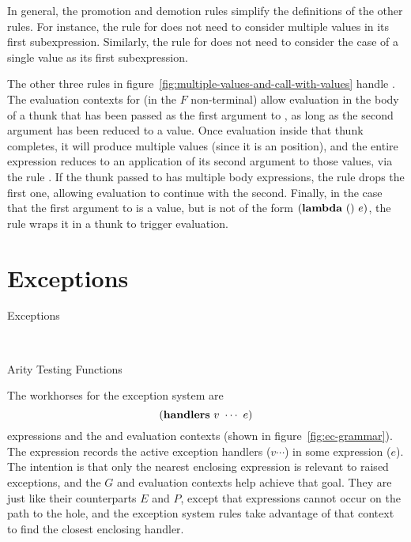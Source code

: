 In general, the promotion and demotion rules simplify the definitions
of the other rules. For instance, the rule for  does not
need to consider multiple values in its first subexpression.
Similarly, the rule for  does not need to consider the
case of a single value as its first subexpression.

The other three rules in
figure~\ref{fig:multiple-values-and-call-with-values} handle
. The evaluation contexts for
 (in the $F$ non-terminal) allow
evaluation in the body of a thunk that has been passed as the first
argument to , as long as the second argument
has been reduced to a value. Once evaluation inside that thunk
completes, it will produce multiple values (since it is an \Fstar{}
position), and the entire  expression reduces
to an application of its second argument to those values, via the rule
. If the thunk passed to  has
multiple body expressions, the rule  drops the first
one, allowing evaluation to continue with the second. Finally, in the
case that the first argument to  is a value,
but is not of the form $(\textnormal{\textbf{lambda}}~()~e)$, the rule
 wraps it in a thunk to trigger evaluation.

\section{Exceptions}

\beginfig
\begin{center}

\end{center}
\caption{Exceptions}\label{fig:exceptions}
\endfig

\beginfig
\begin{center}
\begin{minipage}{0.45\textwidth}

\end{minipage}
~
\begin{minipage}{0.45\textwidth}

\end{minipage}
\end{center}
\caption{Arity Testing Functions}\label{fig:arity}
\endfig

The workhorses for the exception system are $$(\textnormal{\textbf{handlers}}~v~\cdots{}~e)$$ expressions and the  and  evaluation contexts (shown in
figure~\ref{fig:ec-grammar}). The  expression records the
active exception handlers ($v \cdots$) in some expression ($e$). The
intention is that only the nearest enclosing  expression
is relevant to raised exceptions, and the $G$ and  evaluation
contexts help achieve that goal. They are just like their counterparts
$E$ and $P$, except that  expressions cannot occur on the
path to the hole, and the exception system rules take advantage of
that context to find the closest enclosing handler.

